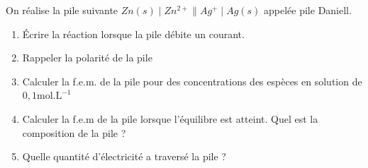 \documentclass[a4paper,french,bookmarks]{book}
\begin{document}
    On réalise la pile suivante $Zn(s)\mid Zn^{2+}\|Ag^+\mid Ag(s)$ appelée pile Daniell. 
    \begin{enumerate}
        \item Écrire la réaction lorsque la pile débite un courant.

        \nobefore\yesafter
        \yesbefore
        
        \item Rappeler la polarité de la pile 


        \item Calculer la f.e.m. de la pile pour des concentrations des espèces en solution de $0,1\text{mol.L}^{-1}$ 

        \nobefore\yesafter 
        \yesbefore 
        
        \item Calculer la f.e.m de la pile lorsque l'équilibre est atteint. Quel est la composition de la pile ?

        \item Quelle quantité d'électricité a traversé la pile ?
    \end{enumerate}
\end{document}
